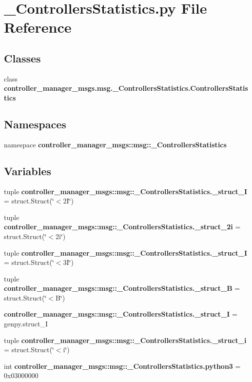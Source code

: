 \section{\-\_\-\-Controllers\-Statistics.\-py \-File \-Reference}
\label{__ControllersStatistics_8py}
\subsection*{\-Classes}
\begin{DoxyCompactItemize}
\item 
class {\bf controller\-\_\-manager\-\_\-msgs.\-msg.\-\_\-\-Controllers\-Statistics.\-Controllers\-Statistics}
\end{DoxyCompactItemize}
\subsection*{\-Namespaces}
\begin{DoxyCompactItemize}
\item 
namespace {\bf controller\-\_\-manager\-\_\-msgs\-::msg\-::\-\_\-\-Controllers\-Statistics}
\end{DoxyCompactItemize}
\subsection*{\-Variables}
\begin{DoxyCompactItemize}
\item 
tuple {\bf controller\-\_\-manager\-\_\-msgs\-::msg\-::\-\_\-\-Controllers\-Statistics.\-\_\-struct\-\_\-I} = struct.\-Struct(\char`\"{}$<$2\-I\char`\"{})
\item 
tuple {\bf controller\-\_\-manager\-\_\-msgs\-::msg\-::\-\_\-\-Controllers\-Statistics.\-\_\-struct\-\_\-2i} = struct.\-Struct(\char`\"{}$<$2i\char`\"{})
\item 
tuple {\bf controller\-\_\-manager\-\_\-msgs\-::msg\-::\-\_\-\-Controllers\-Statistics.\-\_\-struct\-\_\-I} = struct.\-Struct(\char`\"{}$<$3\-I\char`\"{})
\item 
tuple {\bf controller\-\_\-manager\-\_\-msgs\-::msg\-::\-\_\-\-Controllers\-Statistics.\-\_\-struct\-\_\-\-B} = struct.\-Struct(\char`\"{}$<$\-B\char`\"{})
\item 
{\bf controller\-\_\-manager\-\_\-msgs\-::msg\-::\-\_\-\-Controllers\-Statistics.\-\_\-struct\-\_\-\-I} = genpy.\-struct\-\_\-\-I
\item 
tuple {\bf controller\-\_\-manager\-\_\-msgs\-::msg\-::\-\_\-\-Controllers\-Statistics.\-\_\-struct\-\_\-i} = struct.\-Struct(\char`\"{}$<$i\char`\"{})
\item 
int {\bf controller\-\_\-manager\-\_\-msgs\-::msg\-::\-\_\-\-Controllers\-Statistics.\-python3} = 0x03000000
\end{DoxyCompactItemize}
